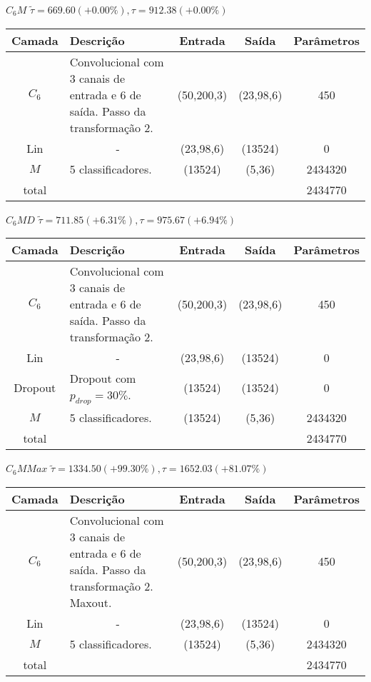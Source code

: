 \begin{tiny}
\begin{table}[H]
	$C_6M$ $\tilde{\tau}=669.60 (+0.00\%), \tau=912.38 (+0.00\%)$\newline
	\begin{tabularx}{\linewidth}{ |c|X|c|c|c| }
		\hline
		Camada & Descrição & Entrada & Saída & Parâmetros \\ \hline
		$C_{6}$ & Convolucional com 3 canais de entrada e 6 de saída. Passo da transformação 2. & (50,200,3) & (23,98,6) & 450 \\ \hline
		Lin & \multicolumn{1}{c|}{-} & (23,98,6) & (13524) & 0 \\ \hline
		$M$ & 5 classificadores. & (13524) & (5,36) & 2434320 \\ \hline
		total &  &  &  & 2434770 \\ \hline
	\end{tabularx}
\end{table}

\begin{table}[H]
	$C_6MD$ $\tilde{\tau}=711.85 (+6.31\%), \tau=975.67 (+6.94\%)$\newline
	\begin{tabularx}{\linewidth}{ |c|X|c|c|c| }
		\hline
		Camada & Descrição & Entrada & Saída & Parâmetros \\ \hline
		$C_{6}$ & Convolucional com 3 canais de entrada e 6 de saída. Passo da transformação 2. & (50,200,3) & (23,98,6) & 450 \\ \hline
		Lin & \multicolumn{1}{c|}{-} & (23,98,6) & (13524) & 0 \\ \hline
		Dropout & Dropout com $p_{drop} = 30\%$. & (13524) & (13524) & 0 \\ \hline
		$M$ & 5 classificadores. & (13524) & (5,36) & 2434320 \\ \hline
		total &  &  &  & 2434770 \\ \hline
	\end{tabularx}
\end{table}

\begin{table}[H]
	$C_6MMax$ $\tilde{\tau}=1334.50 (+99.30\%), \tau=1652.03 (+81.07\%)$\newline
	\begin{tabularx}{\linewidth}{ |c|X|c|c|c| }
		\hline
		Camada & Descrição & Entrada & Saída & Parâmetros \\ \hline
		$C_{6}$ & Convolucional com 3 canais de entrada e 6 de saída. Passo da transformação 2. Maxout. & (50,200,3) & (23,98,6) & 450 \\ \hline
		Lin & \multicolumn{1}{c|}{-} & (23,98,6) & (13524) & 0 \\ \hline
		$M$ & 5 classificadores. & (13524) & (5,36) & 2434320 \\ \hline
		total &  &  &  & 2434770 \\ \hline
	\end{tabularx}
\end{table}


\end{tiny}
